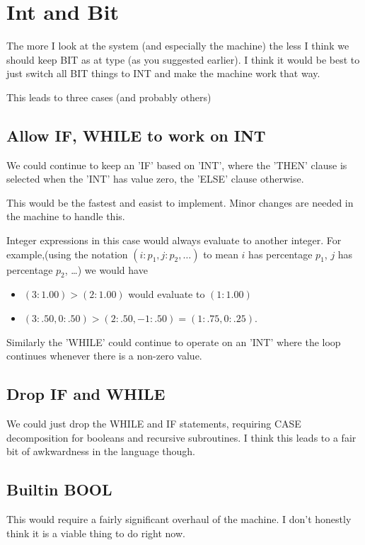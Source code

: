 \documentclass[12pt,letter]{article}
\begin{document}
\section{Int and Bit}\label{sec:intandbit}
The more I look at the system (and especially the machine) the less I think
we should keep BIT as at type (as you suggested earlier). I think it would
be best to just switch all BIT things to INT and make the machine work 
that way. 

This leads to three cases (and probably others)
\subsection{Allow IF, WHILE to work on INT}
We could continue to keep an 'IF' based on 'INT', where the 'THEN' clause
is selected when the 'INT' has value zero, the 'ELSE' clause otherwise.

This would be the fastest and easist to implement. Minor changes are needed
in the machine to handle this. 

Integer expressions in this case would always evaluate to another integer.
For example,(using the notation $(i:p_1,j:p_2,\ldots)$ to mean $i$ has 
percentage $p_1$, $j$ has percentage $p_2$, \ldots)
we would have
\begin{itemize}
\item{} $(3:1.00) > (2:1.00)$ would evaluate to $(1:1.00)$
\item{} $(3:.50, 0:.50) > (2:.50,-1:.50) = (1:.75,0:.25)$.
\end{itemize}

Similarly the 'WHILE' could continue to operate on an 'INT' where the loop 
continues whenever there is a non-zero value.
\subsection{Drop IF and WHILE}\label{sec:dropifwhile}
We could just drop the WHILE and IF statements, requiring 
CASE decomposition for booleans and recursive subroutines. I think this
leads to a fair bit of awkwardness in the language though.

\subsection{Builtin BOOL}
This would require a fairly significant overhaul of the machine. I
don't honestly think it is a viable thing to do right now.
\end{document}
